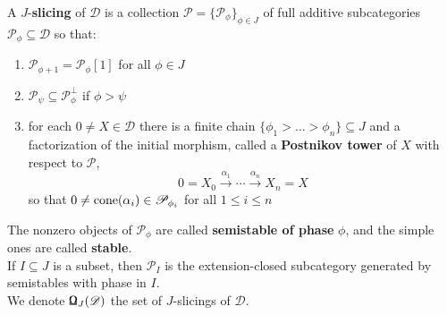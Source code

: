 %

\begin{defn}\label{q}
A $J$-\textbf{slicing} of  $\mathscr{D}$ is a collection $\mathscr{P}=\{ \mathscr{P}_{\phi} \}_{\phi \in J}$ of full additive subcategories $\mathscr{P}_{\phi} \subseteq \mathscr{D}$ so that: 
\begin{enumerate}
\item $\mathscr{P}_{\phi+1}=\mathscr{P}_{\phi}[1]$ for all $\phi \in J$
\item $\mathscr{P}_{\psi} \subseteq \mathscr{P}_{\phi }^{\perp}$ if  $\phi > \psi$
\item for each $0 \not = X \in \mathscr{D}$ there is a finite chain $\{ \phi_1 > \dots > \phi_n \} \subseteq J$ and a factorization of the initial morphism, called a \textbf{Postnikov tower} of $X$ with respect to $\mathscr{P}$, $$0=X_0 \overset{\alpha_1}{\longrightarrow} \cdots \overset{\alpha_n}{\longrightarrow} X_n=X$$ so that $0 \not = \textnormal{cone}(\alpha_i) \in \mathscr{P}_{\phi_i}$ for all $1 \le i \le n$ 
\end{enumerate}
The nonzero objects of $\mathscr{P}_{\phi}$ are called \textbf{semistable of phase} $\phi$, and the simple ones are called \textbf{stable}. \\ 
If $ I \subseteq J$ is a subset, then $\mathscr{P}_I$ is the extension-closed subcategory generated by semistables with phase in $I$. \\
We denote $\textnormal{\Libra}_J(\mathscr{D})$ the set of $J$-slicings of $\mathscr{D}$. 
\end{defn}

